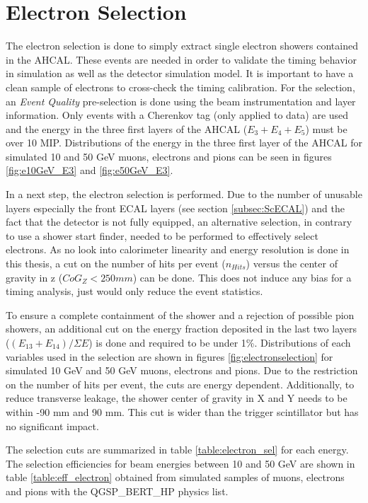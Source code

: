 \section{Electron Selection}
\label{subsec:elec_sel}

The electron selection is done to simply extract single electron showers contained in the AHCAL. These events are needed in order to validate the timing behavior in simulation as well as the detector simulation model. It is important to have a clean sample of electrons to cross-check the timing calibration. For the selection, an \textit{Event Quality} pre-selection is done using the beam instrumentation and layer information. Only events with a Cherenkov tag (only applied to data) are used and the energy in the three first layers of the AHCAL ($E_3+E_4+E_5$) must be over 10 MIP. Distributions of the energy in the three first layer of the AHCAL for simulated 10 and 50 GeV muons, electrons and pions can be seen in figures \ref{fig:e10GeV_E3} and \ref{fig:e50GeV_E3}.

In a next step, the electron selection is performed. Due to the number of unusable layers especially the front ECAL layers (see section \ref{subsec:ScECAL}) and the fact that the detector is not fully equipped, an alternative selection, in contrary to use a shower start finder, needed to be performed to effectively select electrons. As no look into calorimeter linearity and energy resolution is done in this thesis, a cut on the number of hits per event ($n_{Hits}$) versus the center of gravity in z ($CoG_Z < 250 mm$) can be done. This does not induce any bias for a timing analysis, just would only reduce the event statistics.

To ensure a complete containment of the shower and a rejection of possible pion showers, an additional cut on the energy fraction deposited in the last two layers ($(E_{13}+E_{14})/\Sigma E$) is done and required to be under 1\%. Distributions of each variables used in the selection are shown in figures \ref{fig:electronselection} for simulated 10 GeV and 50 GeV muons, electrons and pions. Due to the restriction on the number of hits per event, the cuts are energy dependent. Additionally, to reduce transverse leakage, the shower center of gravity in X and Y needs to be within -90 mm and 90 mm. This cut is wider than the trigger scintillator but has no significant impact.

The selection cuts are summarized in table \ref{table:electron_sel} for each energy. The selection efficiencies for beam energies between 10 and 50 GeV are shown in table \ref{table:eff_electron} obtained from simulated samples of muons, electrons and pions with the QGSP\_BERT\_HP physics list.

